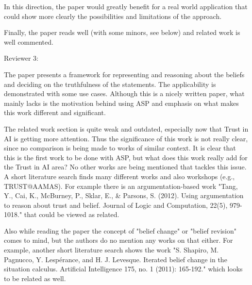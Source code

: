 In this direction, the paper would greatly benefit for a real world application 
that could show more clearly the possibilities and limitations of the approach.

Finally, the paper reads well (with some minors, see below) and related work is well commented.


Reviewer 3:

The paper presents a framework for representing and reasoning about the beliefs and deciding on the truthfulness of the statements. The applicability is demonstrated with some use cases. Although this is a nicely written paper, what mainly lacks is the motivation behind using ASP and emphasis on what makes this work different and significant. 

The related work section is quite weak and outdated, especially now that Trust in AI is getting more attention. Thus the significance of this work is not really clear, since no comparison is being made to works of similar context. It is clear that this is the first work to be done with ASP, but what does this work really add for the Trust in AI area? No other works are being mentioned that tackles this issue. A short literature search finds many different works and also workshops (e.g., TRUST@AAMAS). For example there is an argumentation-based work "Tang, Y., Cai, K., McBurney, P., Sklar, E., & Parsons, S. (2012). Using argumentation to reason about trust and belief. Journal of Logic and Computation, 22(5), 979-1018." that could be viewed as related. 

Also while reading the paper the concept of "belief change" or "belief revision" comes to mind, but the authors do no mention any works on that either. For example, another short literature search shows the work "S. Shapiro, M. Pagnucco, Y. Lespérance, and H. J. Levesque. Iterated belief change in the situation calculus. Artificial Intelligence 175, no. 1 (2011): 165-192." which looks to be related as well.


